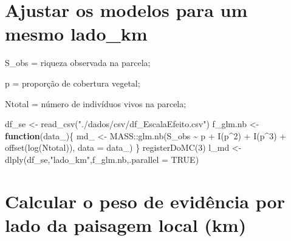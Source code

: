 \documentclass{article}
\newenvironment{Shaded}{\begin{snugshade}}{\end{snugshade}}
\newcommand{\AttributeTok}[1]{\textcolor[rgb]{0.77,0.63,0.00}{#1}}
\newcommand{\ConstantTok}[1]{\textcolor[rgb]{0.00,0.00,0.00}{#1}}
\newcommand{\ControlFlowTok}[1]{\textcolor[rgb]{0.13,0.29,0.53}{\textbf{#1}}}
\newcommand{\DecValTok}[1]{\textcolor[rgb]{0.00,0.00,0.81}{#1}}
\newcommand{\FunctionTok}[1]{\textcolor[rgb]{0.00,0.00,0.00}{#1}}
\newcommand{\NormalTok}[1]{#1}
\newcommand{\OtherTok}[1]{\textcolor[rgb]{0.56,0.35,0.01}{#1}}
\newcommand{\SpecialCharTok}[1]{\textcolor[rgb]{0.00,0.00,0.00}{#1}}
\newcommand{\StringTok}[1]{\textcolor[rgb]{0.31,0.60,0.02}{#1}}
\begin{document}
\hypertarget{ajustar-os-modelos-para-um-mesmo-lado_km}{%
\section{Ajustar os modelos para um mesmo
lado\_km}\label{ajustar-os-modelos-para-um-mesmo-lado_km}}

S\_obs = riqueza observada na parcela;

p = proporção de cobertura vegetal;

Ntotal = número de indivíduos vivos na parcela;

\begin{Shaded}
\begin{Highlighting}[]
\NormalTok{df\_se }\OtherTok{\textless{}{-}} \FunctionTok{read\_csv}\NormalTok{(}\StringTok{"./dados/csv/df\_EscalaEfeito.csv"}\NormalTok{)}
\NormalTok{f\_glm.nb }\OtherTok{\textless{}{-}} \ControlFlowTok{function}\NormalTok{(data\_)\{}
\NormalTok{  md\_ }\OtherTok{\textless{}{-}}\NormalTok{ MASS}\SpecialCharTok{::}\FunctionTok{glm.nb}\NormalTok{(S\_obs }\SpecialCharTok{\textasciitilde{}}\NormalTok{ p }\SpecialCharTok{+} \FunctionTok{I}\NormalTok{(p}\SpecialCharTok{\^{}}\DecValTok{2}\NormalTok{) }\SpecialCharTok{+} \FunctionTok{I}\NormalTok{(p}\SpecialCharTok{\^{}}\DecValTok{3}\NormalTok{) }\SpecialCharTok{+} \FunctionTok{offset}\NormalTok{(}\FunctionTok{log}\NormalTok{(Ntotal)), }\AttributeTok{data =}\NormalTok{ data\_)}
\NormalTok{\}}
\FunctionTok{registerDoMC}\NormalTok{(}\DecValTok{3}\NormalTok{)}
\NormalTok{l\_md }\OtherTok{\textless{}{-}} \FunctionTok{dlply}\NormalTok{(df\_se,}\StringTok{"lado\_km"}\NormalTok{,f\_glm.nb,}\AttributeTok{.parallel =} \ConstantTok{TRUE}\NormalTok{)}
\end{Highlighting}
\end{Shaded}

\hypertarget{calcular-o-peso-de-eviduxeancia-por-lado-da-paisagem-local-km}{%
\section{Calcular o peso de evidência por lado da paisagem local
(km)}\label{calcular-o-peso-de-eviduxeancia-por-lado-da-paisagem-local-km}}
\end{document}
